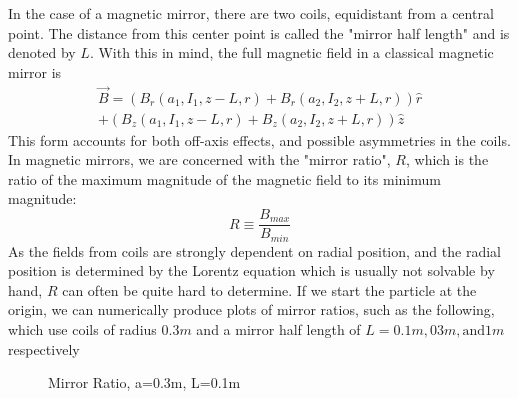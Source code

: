 \documentclass[12pt]{article}
\begin{document}
In the case of a magnetic mirror, there are two coils, equidistant from a central point. The distance from this center point is called the "mirror half length" and is denoted by $L$. With this in mind, the full magnetic field in a classical magnetic mirror is
\begin{equation}\label{magmirB}
\begin{split}
\vec{B}=\left(B_r(a_1,I_1,z-L,r)+B_r(a_2,I_2,z+L,r)\right)\hat{r}\\
+\left(B_z(a_1,I_1,z-L,r)+B_z(a_2,I_2,z+L,r)\right)\hat{z}
\end{split}
\end{equation}
This form accounts for both off-axis effects, and possible asymmetries in the coils. In magnetic mirrors, we are concerned with the "mirror ratio", $R$, which is the ratio of the maximum magnitude of the magnetic field to its minimum magnitude:
\begin{equation}\label{mirrorratio}
R\equiv\frac{B_{max}}{B_{min}}
\end{equation}
As the fields from coils are strongly dependent on radial position, and the radial position is determined by the Lorentz equation which is usually not solvable by hand, $R$ can often be quite hard to determine. If we start the particle at the origin, we can numerically produce plots of mirror ratios, such as the following, which use coils of radius $0.3m$ and a mirror half length of $L=0.1m,03m,\text{and} 1m$ respectively
\begin{figure}[h!]
  \caption{\label{fig:R0.1} Mirror Ratio, a=0.3m, L=0.1m}
\end{figure}
\end{document}
